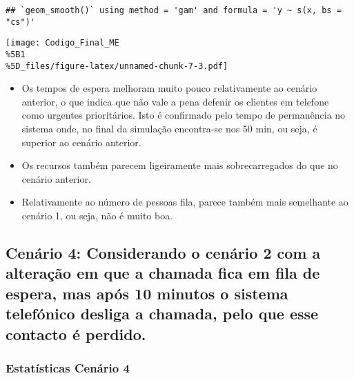 \documentclass[
]{article}
\providecommand{\tightlist}{%
  \setlength{\itemsep}{0pt}\setlength{\parskip}{0pt}}
\begin{document}
\begin{verbatim}
## `geom_smooth()` using method = 'gam' and formula = 'y ~ s(x, bs = "cs")'
\end{verbatim}

\texttt{[image: Codigo\_Final\_ME\\\%5B1\\\%5D\_files/figure-latex/unnamed-chunk-7-3.pdf]}

\begin{itemize}
\tightlist
\item
  Os tempos de espera melhoram muito pouco relativamente ao cenário
  anterior, o que indica que não vale a pena defenir os clientes em
  telefone como urgentes prioritários. Isto é confirmado pelo tempo de
  permanência no sistema onde, no final da simulação encontra-se nos 50
  min, ou seja, é superior ao cenário anterior.
\item
  Os recursos também parecem ligeiramente mais sobrecarregados do que no
  cenário anterior.
\item
  Relativamente ao número de pessoas fila, parece também mais semelhante
  ao cenário 1, ou seja, não é muito boa.
\end{itemize}

\subsection{Cenário 4: Considerando o cenário 2 com a alteração em que a
chamada fica em fila de espera, mas após 10 minutos o sistema telefónico
desliga a chamada, pelo que esse contacto é
perdido.}\label{cenuxe1rio-4-considerando-o-cenuxe1rio-2-com-a-alterauxe7uxe3o-em-que-a-chamada-fica-em-fila-de-espera-mas-apuxf3s-10-minutos-o-sistema-telefuxf3nico-desliga-a-chamada-pelo-que-esse-contacto-uxe9-perdido.}

\subsubsection{Estatísticas Cenário
4}\label{estatuxedsticas-cenuxe1rio-4}
\end{document}
